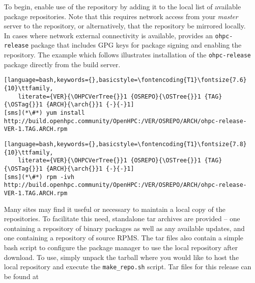 To begin, enable use of the \OHPC{} repository by adding it to the local list
of available package repositories. Note that this requires network access from
your {\em master} server to the \OHPC{} repository, or alternatively, that
the \OHPC{} repository be mirrored locally.  In cases where network external
connectivity is available, \OHPC{} provides an \texttt{ohpc-release} package
that includes GPG keys for package signing and enabling the repository.  The
example which follows illustrates installation of the \texttt{ohpc-release}
package directly from the \OHPC{} build server.

\begin{lstlisting}[language=bash,keywords={},basicstyle=\fontencoding{T1}\fontsize{7.6}{10}\ttfamily,
	literate={VER}{\OHPCVerTree{}}1 {OSREPO}{\OSTree{}}1 {TAG}{\OSTag{}}1 {ARCH}{\arch{}}1 {-}{-}1]
[sms](*\#*) yum install http://build.openhpc.community/OpenHPC:/VER/OSREPO/ARCH/ohpc-release-VER-1.TAG.ARCH.rpm
\end{lstlisting}
\else
\begin{lstlisting}[language=bash,keywords={},basicstyle=\fontencoding{T1}\fontsize{7.8}{10}\ttfamily,
	literate={VER}{\OHPCVerTree{}}1 {OSREPO}{\OSTree{}}1 {TAG}{\OSTag{}}1 {ARCH}{\arch{}}1 {-}{-}1]
[sms](*\#*) rpm -ivh http://build.openhpc.community/OpenHPC:/VER/OSREPO/ARCH/ohpc-release-VER-1.TAG.ARCH.rpm
\end{lstlisting}
\fi

\begin{center}
\begin{tcolorbox}[]
\small Many sites may find it useful or necessary to maintain a local copy of the
\OHPC{} repositories. To facilitate this need, standalone tar 
archives are provided -- one containing a repository of binary packages as well as any
available updates, and one containing a repository of source RPMS. The tar files
also contain a simple bash script to configure the package manager to use the
local repository after download. To use, simply unpack the tarball where you
would like to host the local repository and execute the \texttt{make\_repo.sh} script.
Tar files for this release can be found at \href{http://build.openhpc.community/dist/\OHPCVersion}
        {\color{blue}{http://build.openhpc.community/dist/\OHPCVersion}}
\end{tcolorbox}
\end{center}
